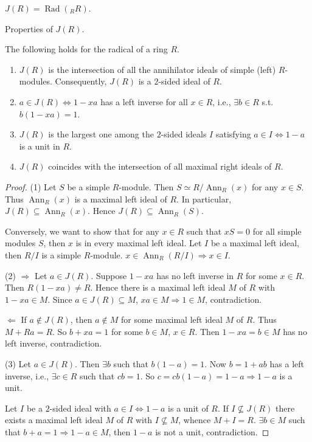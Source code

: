 \documentclass[11pt, a4paper]{report}
\begin{document}
\begin{remark}
$J(R)=\operatorname{Rad}({}_{R}R)$.
\end{remark}

\begin{theorem}
Properties of $J(R)$.

The following holds for the radical of a ring $R$.
\begin{enumerate}
\item $J(R)$ is the intersection of all the annihilator ideals of simple (left) $R$-modules. Consequently, $J(R)$ is a $2$-sided ideal of $R$.
\item $a \in J(R) \Leftrightarrow 1-xa$ has a left inverse for all $x \in R$, i.e., $\exists b \in R$ s.t.\ $b(1-xa)=1$.
\item $J(R)$ is the largest one among the $2$-sided ideals $I$ satisfying $a \in I \Leftrightarrow 1-a$ is a unit in $R$.
\item $J(R)$ coincides with the intersection of all maximal right ideals of $R$.
\end{enumerate}
\end{theorem}
\begin{proof}
(1) Let $S$ be a simple $R$-module. Then $S \simeq R / \operatorname{Ann}_{R}(x)$ for any $x \in S$. Thus $\operatorname{Ann}_{R}(x)$ is a maximal left ideal of $R$. In particular, $J(R) \subseteq \operatorname{Ann}_{R}(x)$. Hence $J(R) \subseteq \operatorname{Ann}_{R}(S)$.

Conversely, we want to show that for any $x \in R$ such that $x S = 0$ for all simple modules $S$, then $x$ is in every maximal left ideal. Let $I$ be a maximal left ideal, then $R / I$ is a simple $R$-module. $x \in \operatorname{Ann}_{R}(R / I) \Rightarrow x \in I$.

(2) $\Rightarrow$ Let $a \in J(R)$. Suppose $1 - xa$ has no left inverse in $R$ for some $x \in R$. Then $R(1 - xa) \neq R$. Hence there is a maximal left ideal $M$ of $R$ with $1 - xa \in M$. Since $a \in J(R) \subseteq M$, $xa \in M \Rightarrow 1 \in M$, contradiction.

$\Leftarrow$ If $a \notin J(R)$, then $a \notin M$ for some maximal left ideal $M$ of $R$. Thus $M + Ra = R$. So $b + xa = 1$ for some $b \in M$, $x \in R$. Then $1 - xa = b \in M$ has no left inverse, contradiction.

(3) Let $a \in J(R)$. Then $\exists b$ such that $b(1 - a) = 1$. Now $b = 1 + ab$ has a left inverse, i.e., $\exists c \in R$ such that $cb = 1$. So $c = cb(1 - a) = 1 - a \Rightarrow 1 - a$ is a unit.

Let $I$ be a $2$-sided ideal with $a \in I \Leftrightarrow 1 - a$ is a unit of $R$. If $I \not\subseteq J(R)$ there exists a maximal left ideal $M$ of $R$ with $I \not\subseteq M$, whence $M + I = R$. $\exists b \in M$ such that $b + a = 1 \Rightarrow 1 - a \in M$, then $1 - a$ is not a unit, contradiction.
\end{proof}
\end{document}
